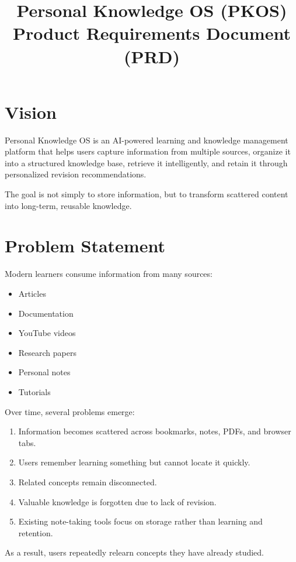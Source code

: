 \documentclass[11pt]{article}
\title{Personal Knowledge OS (PKOS) \\ \large Product Requirements Document (PRD)}
\author{}
\date{}
\begin{document}
\maketitle

\section{Vision}

Personal Knowledge OS is an AI-powered learning and knowledge management platform that helps users capture information from multiple sources, organize it into a structured knowledge base, retrieve it intelligently, and retain it through personalized revision recommendations.

The goal is not simply to store information, but to transform scattered content into long-term, reusable knowledge.

\section{Problem Statement}

Modern learners consume information from many sources:

\begin{itemize}[nosep]
    \item Articles
    \item Documentation
    \item YouTube videos
    \item Research papers
    \item Personal notes
    \item Tutorials
\end{itemize}

Over time, several problems emerge:

\begin{enumerate}[nosep]
    \item Information becomes scattered across bookmarks, notes, PDFs, and browser tabs.
    \item Users remember learning something but cannot locate it quickly.
    \item Related concepts remain disconnected.
    \item Valuable knowledge is forgotten due to lack of revision.
    \item Existing note-taking tools focus on storage rather than learning and retention.
\end{enumerate}

As a result, users repeatedly relearn concepts they have already studied.
\end{document}
